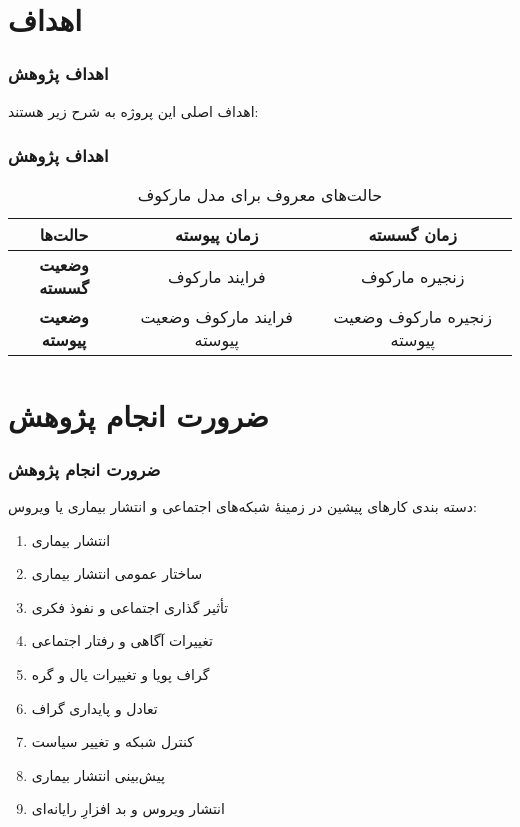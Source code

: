 \documentclass[xcolor=dvipsnames, professionalfonts, aspectratio=169, 11pt]{beamer}
\begin{document}
\section{اهداف}
\begin{frame}
    \frametitle{اهداف پژوهش}
    اهداف اصلی این پروژه به شرح زیر هستند:


\end{frame}

\begin{frame}
    \frametitle{اهداف پژوهش}
    \begin{table}
        \caption{حالت‌های معروف برای مدل مارکوف}
        \vspace{-1em}
        \small
        \begin{tabular}{|c|c|c|}
            \hline
            \textbf{حالت‌ها}       & \textbf{زمان پیوسته}       & \textbf{زمان گسسته}        \\
            \hline
            \textbf{وضعیت گسسته}  & فرایند مارکوف              & زنجیره مارکوف              \\
            \hline
            \textbf{وضعیت پیوسته} & فرایند مارکوف وضعیت پیوسته & زنجیره مارکوف وضعیت پیوسته \\
            \hline
        \end{tabular}
    \end{table}

\end{frame}


\section{ضرورت انجام پژوهش}
\begin{frame}
    \frametitle{ضرورت انجام پژوهش}

    دسته بندی کارهای پیشین در زمینهٔ شبکه‌های اجتماعی و انتشار بیماری  یا ویروس:
    {
    \begin{enumerate}\RTList
        \item<1-2> انتشار بیماری
        \item ساختار عمومی انتشار بیماری
        \item تأثیر گذاری اجتماعی و نفوذ فکری
        \item تغییرات آگاهی و رفتار اجتماعی
        \item<1> گراف پویا و تغییرات یال و گره
        \item<1> تعادل و پایداری گراف
        \item<1> کنترل شبکه و تغییر سیاست
        \item<1> پیش‌بینی انتشار بیماری
        \item<1> انتشار ویروس و بد افزارِ رایانه‌ای

    \end{enumerate}
    }
\end{frame}
\end{document}
